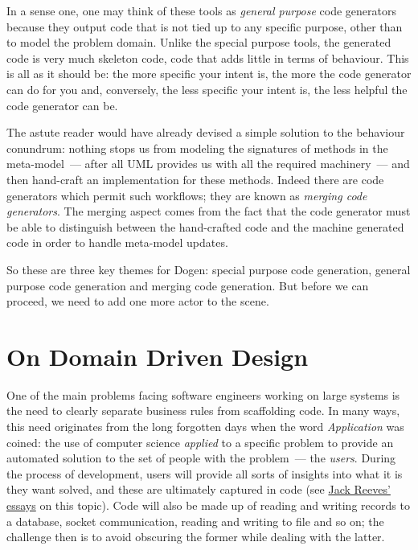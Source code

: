 \documentclass{book}
\begin{document}
In a sense one, one may think of these tools as \emph{general purpose}
code generators because they output code that is not tied up to any
specific purpose, other than to model the problem domain. Unlike the
special purpose tools, the generated code is very much skeleton code,
code that adds little in terms of behaviour. This is all as it should
be: the more specific your intent is, the more the code generator can
do for you and, conversely, the less specific your intent is, the less
helpful the code generator can be.

The astute reader would have already devised a simple solution to the
behaviour conundrum: nothing stops us from modeling the signatures of
methods in the meta-model~--- after all UML provides us with all the
required machinery~--- and then hand-craft an implementation for these
methods. Indeed there are code generators which permit such workflows;
they are known as \emph{merging code generators}. The merging aspect
comes from the fact that the code generator must be able to
distinguish between the hand-crafted code and the machine generated
code in order to handle meta-model updates.

So these are three key themes for Dogen: special purpose code
generation, general purpose code generation and merging code
generation. But before we can proceed, we need to add one more actor
to the scene.

\section{On Domain Driven Design}

One of the main problems facing software engineers working on large
systems is the need to clearly separate business rules from
scaffolding code. In many ways, this need originates from the long
forgotten days when the word \emph{Application} was coined: the use of
computer science \emph{applied} to a specific problem to provide an
automated solution to the set of people with the problem~--- the
\emph{users}. During the process of development, users will provide
all sorts of insights into what it is they want solved, and these are
ultimately captured in code (see
\href{http://www.developerdotstar.com/mag/articles/PDF/DevDotStar_Reeves_CodeAsDesign.pdf}{Jack
  Reeves' essays} on this topic). Code will also be made up of reading
and writing records to a database, socket communication, reading and
writing to file and so on; the challenge then is to avoid obscuring
the former while dealing with the latter.
\end{document}
